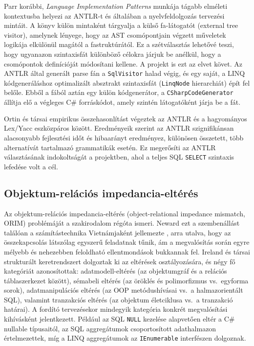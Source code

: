 \documentclass[a4paper,12pt]{article}
\begin{document}
Parr korábbi, \textit{Language Implementation Patterns} \cite{parr2009lip} munkája tágabb elméleti kontextusba helyezi az ANTLR-t és általában a nyelvfeldolgozás tervezési mintáit. A könyv külön mintaként tárgyalja a külső fa-látogatót (external tree visitor), amelynek lényege, hogy az AST csomópontjain végzett műveletek logikája elkülönül magától a fastruktúrától. Ez a szétválasztás lehetővé teszi, hogy ugyanazon szintaxisfát különböző célokra járjuk be anélkül, hogy a csomópontok definícióját módosítani kellene. A projekt is ezt az elvet követ. Az ANTLR által generált parse fán a \texttt{SqlVisitor} halad végig, és egy saját, a LINQ kódgeneráláshoz optimalizált absztrakt szintaxisfát (\texttt{LinqNode} hierarchiát) épít fel belőle. Ebből a fából aztán egy külön kódgenerátor, a \texttt{CSharpCodeGenerator} állítja elő a végleges C\# forráskódot, amely szintén látogatóként járja be a fát.

Ortin és társai \cite{ortin2022antlr} empirikus összehasonlítást végeztek az ANTLR és a hagyományos Lex/Yacc eszközpáros között. Eredményeik szerint az ANTLR szignifikánsan alacsonyabb fejlesztési időt és hibaarányt eredményez, különösen összetett, több alternatívát tartalmazó grammatikák esetén. Ez megerősíti az ANTLR választásának indokoltságát a projektben, ahol a teljes SQL \texttt{SELECT} szintaxis lefedése volt a cél.

\subsection{Objektum-relációs impedancia-eltérés}

Az objektum-relációs impedancia-eltérés (object-relational impedance mismatch, ORIM) problémáját a szakirodalom régóta ismeri. Neward ezt a szembenállást találóan a számítástechnika Vietnámjaként jellemezte \cite{neward2006vietnam}, arra utalva, hogy az összekapcsolás látszólag egyszerű feladatnak tűnik, ám a megvalósítás során egyre mélyebb és nehezebben feloldható ellentmondások bukkannak fel. Ireland és társai \cite{ireland2009orim} strukturált keretrendszert dolgoztak ki az eltérések osztályozására, és négy fő kategóriát azonosítottak: adatmodell-eltérés (az objektumgráf és a relációs táblaszerkezet között), sémabeli eltérés (az öröklés és polimorfizmus vs.\ egyforma sorok), adatmanipulációs eltérés (az OOP metódushívásai vs.\ a halmazorientált SQL), valamint tranzakciós eltérés (az objektum életciklusa vs.\ a tranzakció határai). A fordító tervezésekor mindegyik kategória konkrét megvalósítási kihívásként jelentkezett. Például az SQL \texttt{NULL} kezelése alapvetően eltér a C\# nullable típusaitól, az SQL aggregátumok csoportosított adathalmazon értelmezettek, míg a LINQ aggregátumok az \texttt{IEnumerable} interfészen dolgoznak.
\end{document}
